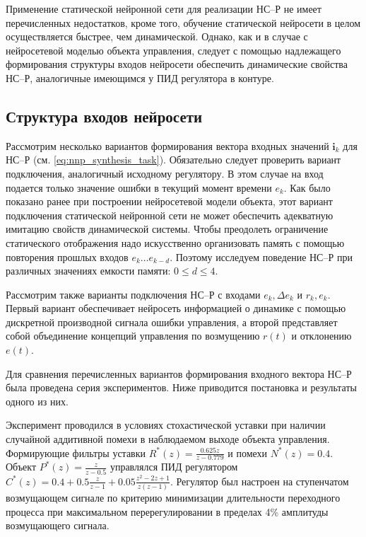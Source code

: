 Применение статической нейронной сети для реализации НС--Р не имеет
перечисленных недостатков, кроме того, обучение статической нейросети
в целом осуществляется быстрее, чем динамической.  Однако, как и в
случае с нейросетевой моделью объекта управления, следует с помощью
надлежащего формирования структуры входов нейросети обеспечить
динамические свойства НС--Р, аналогичные имеющимся у ПИД регулятора в
контуре. 

\subsection{Структура входов нейросети}\label{nnc_inputs}

Рассмотрим несколько вариантов формирования вектора входных значений
$\mathbf{i}_k$ для НС--Р (см. \eqref{eq:nnp_synthesis_task}).
Обязательно следует проверить вариант подключения, аналогичный
исходному регулятору.  В этом случае на вход подается только значение
ошибки в текущий момент времени $e_k$.  Как было показано ранее при
построении нейросетевой модели объекта, этот вариант подключения
статической нейронной сети не может обеспечить адекватную имитацию
свойств динамической системы.  Чтобы преодолеть ограничение
статического отображения надо искусственно организовать память с
помощью повторения прошлых входов $e_k\ldots e_{k-d}$.  Поэтому
исследуем поведение НС--Р при различных значениях емкости памяти:
$0\le d\le 4$.

Рассмотрим также варианты подключения НС--Р с входами $e_k,\Delta e_k$
и $r_k,e_k$.  Первый вариант обеспечивает нейросеть информацией о
динамике с помощью дискретной производной сигнала ошибки управления, а
второй представляет собой объединение концепций управления по
возмущению $r(t)$ и отклонению $e(t)$.

Для сравнения перечисленных вариантов формирования входного вектора
НС--Р была проведена серия экспериментов.  Ниже приводится постановка
и результаты одного из них.

Эксперимент проводился в условиях стохастической уставки при наличии
случайной аддитивной помехи в наблюдаемом выходе объекта управления.
Формирующие фильтры уставки $R^*(z)=\frac{0.625z}{z-0.779}$ и помехи
$N^*(z)=0.4$.  Объект $P^*(z)=\frac{z}{z-0.5}$ управлялся ПИД
регулятором $C^*(z)=0.4 + 0.5\frac{z}{z-1} +
0.05\frac{z^2-2z+1}{z(z-1)}$.  Регулятор был настроен на ступенчатом
возмущающем сигнале по критерию минимизации длительности переходного
процесса при максимальном перерегулировании в пределах 4\% амплитуды
возмущающего сигнала.

